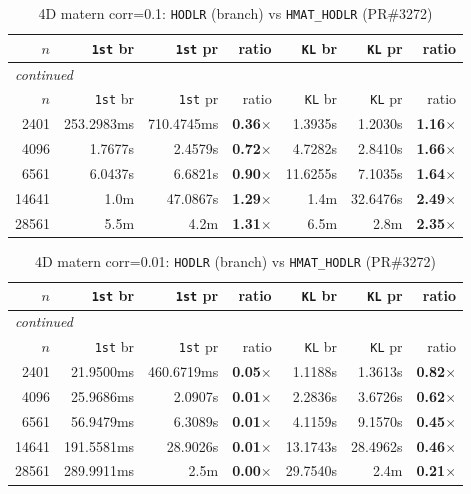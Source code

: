 \documentclass[11pt,a4paper]{article}
\begin{document}
\small\begin{center}
\begin{longtable}{rrrrrrr}
\caption{4D matern corr=0.1: \texttt{HODLR} (branch) vs \texttt{HMAT\_HODLR} (PR\#3272)}
\\\toprule
$n$ & \texttt{1st} br & \texttt{1st} pr & ratio & \texttt{KL} br & \texttt{KL} pr & ratio\\
\midrule
\endfirsthead
\multicolumn{7}{l}{\small\emph{continued}}\\
\toprule
$n$ & \texttt{1st} br & \texttt{1st} pr & ratio & \texttt{KL} br & \texttt{KL} pr & ratio\\
\midrule
\endhead

2401 & 253.2983ms & 710.4745ms & \textbf{0.36$\times$} & 1.3935s & 1.2030s & \textbf{1.16$\times$}\\
4096 & 1.7677s & 2.4579s & \textbf{0.72$\times$} & 4.7282s & 2.8410s & \textbf{1.66$\times$}\\
6561 & 6.0437s & 6.6821s & \textbf{0.90$\times$} & 11.6255s & 7.1035s & \textbf{1.64$\times$}\\
14641 & 1.0m & 47.0867s & \textbf{1.29$\times$} & 1.4m & 32.6476s & \textbf{2.49$\times$}\\
28561 & 5.5m & 4.2m & \textbf{1.31$\times$} & 6.5m & 2.8m & \textbf{2.35$\times$}\\
\bottomrule\end{longtable}\end{center}
\small\begin{center}
\begin{longtable}{rrrrrrr}
\caption{4D matern corr=0.01: \texttt{HODLR} (branch) vs \texttt{HMAT\_HODLR} (PR\#3272)}
\\\toprule
$n$ & \texttt{1st} br & \texttt{1st} pr & ratio & \texttt{KL} br & \texttt{KL} pr & ratio\\
\midrule
\endfirsthead
\multicolumn{7}{l}{\small\emph{continued}}\\
\toprule
$n$ & \texttt{1st} br & \texttt{1st} pr & ratio & \texttt{KL} br & \texttt{KL} pr & ratio\\
\midrule
\endhead

2401 & 21.9500ms & 460.6719ms & \textbf{0.05$\times$} & 1.1188s & 1.3613s & \textbf{0.82$\times$}\\
4096 & 25.9686ms & 2.0907s & \textbf{0.01$\times$} & 2.2836s & 3.6726s & \textbf{0.62$\times$}\\
6561 & 56.9479ms & 6.3089s & \textbf{0.01$\times$} & 4.1159s & 9.1570s & \textbf{0.45$\times$}\\
14641 & 191.5581ms & 28.9026s & \textbf{0.01$\times$} & 13.1743s & 28.4962s & \textbf{0.46$\times$}\\
28561 & 289.9911ms & 2.5m & \textbf{0.00$\times$} & 29.7540s & 2.4m & \textbf{0.21$\times$}\\
\bottomrule\end{longtable}\end{center}
\end{document}
